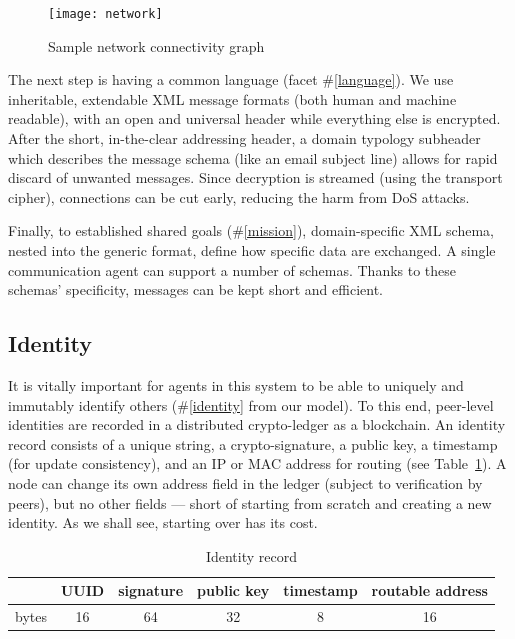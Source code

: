 \begin{figure}
	\centering
	\texttt{[image: network]}
	\caption{Sample network connectivity graph}
	\label{fig:network}
\end{figure}


The next step is having a common language (facet \#\ref{language}). We use inheritable, extendable XML message formats (both human and machine readable), with an open and universal header while everything else is encrypted.
After the short, in-the-clear addressing header, a domain typology subheader which describes the message schema (like an email subject line) allows for rapid discard of unwanted messages.
Since decryption is streamed (using the transport cipher), connections can be cut early, reducing the harm from DoS attacks.

Finally, to established shared goals (\#\ref{mission}), domain-specific XML schema, nested into the generic format, define how specific data are exchanged.
A single communication agent can support a number of schemas.
Thanks to these schemas' specificity, messages can be kept short and efficient.

\begin{ppl}

\end{ppl}


\subsection{Identity}\label{subsec:id}

It is vitally important for agents in this system to be able to uniquely and immutably identify others (\#\ref{identity} from our model).
To this end, peer-level identities are recorded in a distributed crypto-ledger as a blockchain.
An identity record consists of a unique string, a crypto-signature, a public key, a timestamp (for update consistency), and an IP or MAC address for routing (see Table~\ref{tab:identity}).
A node can change its own address field in the ledger (subject to verification by peers), but no other fields --- short of starting from scratch and creating a new identity.
As we shall see, starting over has its cost.

\begin{table}[h!]
	\centering
	\begin{tabular}{ |l||c|c|c|c|c| }
		\hline
		& UUID & signature & public key & timestamp & routable address \\
		\hline
		bytes & 16 & 64 & 32 & 8 & 16 \\
		\hline
	\end{tabular}
	\caption{Identity record}
	\label{tab:identity}
\end{table}

